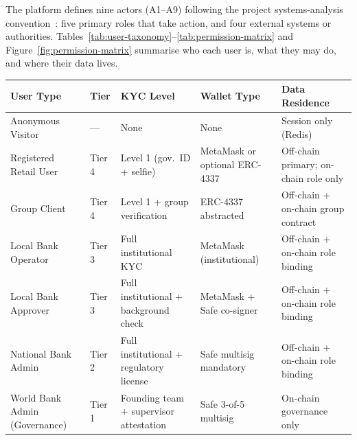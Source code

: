 \documentclass[12pt, a4paper]{report}
\newcommand{\tableheadcolor}{\rowcolor{TableHeadBg}}
\begin{document}
The platform defines nine actors (A1--A9) following the project systems-analysis convention~: five primary roles that take action, and four external systems or authorities. Tables~\ref{tab:user-taxonomy}--\ref{tab:permission-matrix} and Figure~\ref{fig:permission-matrix} summarise who each user is, what they may do, and where their data lives.

\begin{table}[H]
\centering
\begin{tabular}{p{3.1cm}p{1.4cm}p{2.6cm}p{2.4cm}p{3.4cm}}
\toprule
\tableheadcolor
\textbf{User Type} & \textbf{Tier} & \textbf{KYC Level} & \textbf{Wallet Type} & \textbf{Data Residence} \\
\midrule
Anonymous Visitor & --- & None & None & Session only (Redis) \\
Registered Retail User & Tier 4 & Level 1 (gov.\ ID + selfie) & MetaMask or optional ERC-4337 & Off-chain primary; on-chain role only \\
Group Client & Tier 4 & Level 1 + group verification & ERC-4337 abstracted & Off-chain + on-chain group contract \\
Local Bank Operator & Tier 3 & Full institutional KYC & MetaMask (institutional) & Off-chain + on-chain role binding \\
Local Bank Approver & Tier 3 & Full institutional + background check & MetaMask + Safe co-signer & Off-chain + on-chain role binding \\
National Bank Admin & Tier 2 & Full institutional + regulatory license & Safe multisig mandatory & Off-chain + on-chain role binding \\
World Bank Admin (Governance) & Tier 1 & Founding team + supervisor attestation & Safe 3-of-5 multisig & On-chain governance only \\
\bottomrule
\end{tabular}
\end{table}
\end{document}
